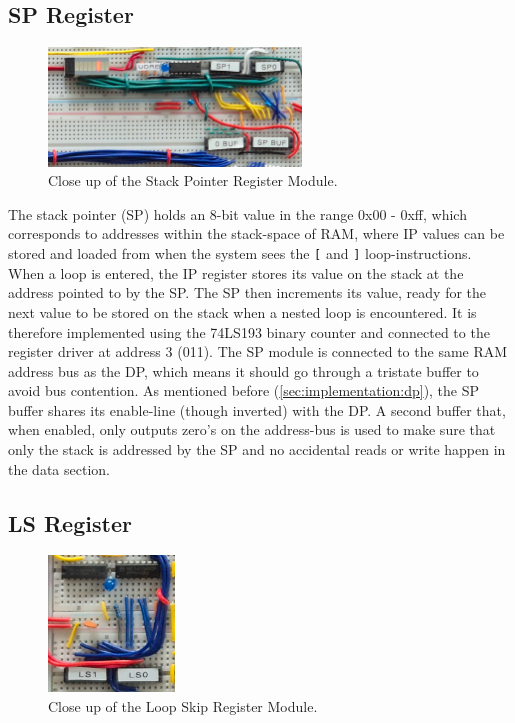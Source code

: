 
\newpage\subsection{SP Register}
\begin{figure}[H]
  \centering
  \includegraphics[width=0.6\textwidth]{img/spregistercloseup}
  \caption{Close up of the Stack Pointer Register Module.}
  \label{fig:spregcloseup}
\end{figure}

The stack pointer (SP) holds an 8-bit value in the range 0x00 - 0xff, which corresponds to addresses within the stack-space of RAM, where IP values can be stored and loaded from when the system sees the \texttt{[} and \texttt{]} loop-instructions. When a loop is entered, the IP register stores its value on the stack at the address pointed to by the SP. The SP then increments its value, ready for the next value to be stored on the stack when a nested loop is encountered. It is therefore implemented using the 74LS193 binary counter and connected to the register driver at address 3 (011). The SP module is connected to the same RAM address bus as the DP, which means it should go through a tristate buffer to avoid bus contention. As mentioned before (\ref{sec:implementation:dp}), the SP buffer shares its enable-line (though inverted) with the DP. A second buffer that, when enabled, only outputs zero's on the address-bus is used to make sure that only the stack is addressed by the SP and no accidental reads or write happen in the data section. 



\newpage\subsection{LS Register}
\begin{figure}[H]
  \centering
  \includegraphics[width=0.3\textwidth]{img/lsregistercloseup}
  \caption{Close up of the Loop Skip Register Module.}
  \label{fig:spregcloseup}
\end{figure}

